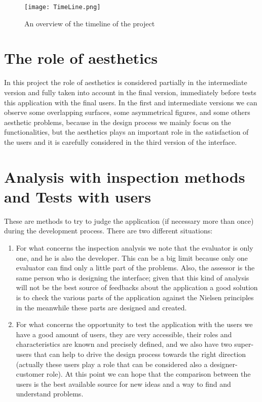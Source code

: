 \begin{figure}[H]
\centering
\texttt{[image: TimeLine.png]} 
\caption{An overview of the timeline of the project}
\end{figure}


\section{The role of aesthetics} 
In this project the role of aesthetics is considered partially in the intermediate version and fully taken into account in the final version, immediately before tests this application with the final users.
In the first and intermediate versions we can observe some overlapping surfaces, some asymmetrical figures, and some others aesthetic problems, because in the design process we mainly focus on the functionalities, but the aesthetics plays an important role in the satisfaction of the users and it is carefully considered in the third version of the interface.  

\section{Analysis with inspection methods and Tests with users}
These are methods to try to judge the application (if necessary more than once) during the development process. There are two different situations:

\begin{enumerate}

\item For what concerns the inspection analysis we note that the evaluator is only one, and he is also the developer. This can be a big limit because only one evaluator can find only a little part of the problems. Also, the assessor is the same person who is designing the interface; given that this kind of analysis will not be the best source of feedbacks about the application a good solution is to check the various parts of the application against the Nielsen principles in the meanwhile these parts are designed and created.

\item For what concerns the opportunity to test the application with the users we have a good amount of users, they are very accessible, their roles and characteristics are known and precisely defined, and we also have two super-users that can help to drive the design process towards the right direction (actually these users play a role that can be considered also a designer-customer role). At this point we can hope that the comparison between the users is the best available source for new ideas and a way to find and understand problems.    

\end{enumerate}

